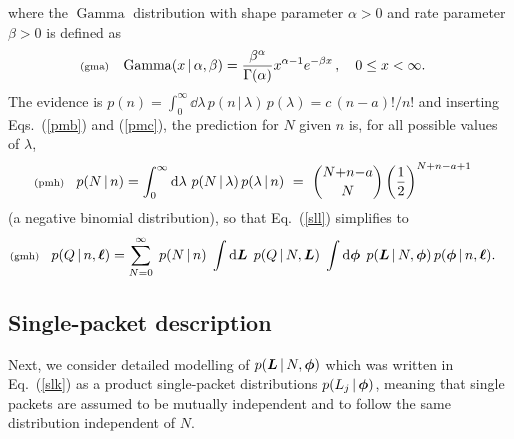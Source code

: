 \documentclass[11pt]{article}
\newcommand{\lleq}[1]{\label{#1} }
\renewcommand{\lleq}[1]{\label{#1} {\scriptstyle {\rm (#1)}} \hspace*{2ex} }
\newcommand{\cond}{\,|\,}
\DeclareMathOperator{\GammaDist}{Gamma}
\newcommand{\rmdx}[1]{\dd{#1}} %
\begin{document}
where the $\GammaDist$ distribution with shape parameter $\alpha > 0$ and
rate parameter $\beta > 0$ is defined as
\begin{align}
  \lleq{gma}
  \GammaDist(x\cond \alpha, \beta)
  &= \frac{\beta^\alpha}{\Gamma(\alpha)} x^{\alpha-1} e^{-\beta x}\,,
  \quad 0 \leq x < \infty.
\end{align}
The evidence is
$p(n) =  \int_0^\infty \rmdx{\lambda}\, p(n\cond\lambda)\,p(\lambda) = c\,(n-a)!/n!$
and inserting Eqs.~(\ref{pmb}) and (\ref{pmc}), the prediction for $N$
given $n$ is, for all possible values of $\lambda$,
\begin{align}
  \lleq{pmh}
  p(N\cond n) %
  &= \int_0^\infty \rmdx{\lambda}\, p(N\cond\lambda)\,p(\lambda\cond n)
  \ =\ \binom{N{+}n{-}a}{N} \left(\frac{1}{2}\right)^{N+n-a+1}
\end{align}
(a negative binomial distribution), so that Eq.~(\ref{sll}) simplifies to
\begin{align}
  \lleq{gmh}
  p(Q\cond n,\bml)
  &= \sum_{N=0}^\infty \;
    p(N\cond n)\;
    \int \rmdx{\bmL}\;
    p(Q\cond N,\bmL)\;
    \int \rmdx{\bmphi}\;
    p(\bmL\cond N,\bmphi)\,
    p(\bmphi\cond n,\bml).
\end{align}

\subsection{Single-packet description}

Next, we consider detailed modelling of $p(\bmL\cond N,\bmphi)$ which
was written in Eq.~(\ref{slk}) as a product single-packet
distributions $p(L_j\cond \bmphi)$, meaning that single packets are
assumed to be mutually independent and to follow the same distribution
independent of $N$.
\end{document}
